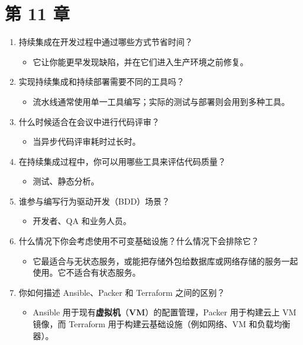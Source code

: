 \section*{第 11 章}

\begin{enumerate}
\item 持续集成在开发过程中通过哪些方式节省时间？

\begin{itemize}
\item 它让你能更早发现缺陷，并在它们进入生产环境之前修复。
\end{itemize}
\item 实现持续集成和持续部署需要不同的工具吗？

\begin{itemize}
\item 流水线通常使用单一工具编写；实际的测试与部署则会用到多种工具。
\end{itemize}
\item 什么时候适合在会议中进行代码评审？

\begin{itemize}
\item 当异步代码评审耗时过长时。
\end{itemize}
\item 在持续集成过程中，你可以用哪些工具来评估代码质量？

\begin{itemize}
\item 测试、静态分析。
\end{itemize}
\item 谁参与编写行为驱动开发（BDD）场景？

\begin{itemize}
\item 开发者、QA 和业务人员。
\end{itemize}
\item 什么情况下你会考虑使用不可变基础设施？什么情况下会排除它？

\begin{itemize}
\item 它最适合与无状态服务，或能把存储外包给数据库或网络存储的服务一起使用。它不适合有状态服务。
\end{itemize}
\item 你如何描述 Ansible、Packer 和 Terraform 之间的区别？

\begin{itemize}
\item Ansible 用于现有\textbf{虚拟机}（\textbf{VM}）的配置管理，Packer 用于构建云上 VM 镜像，而 Terraform 用于构建云基础设施（例如网络、VM 和负载均衡器）。
\end{itemize}
\end{enumerate}

